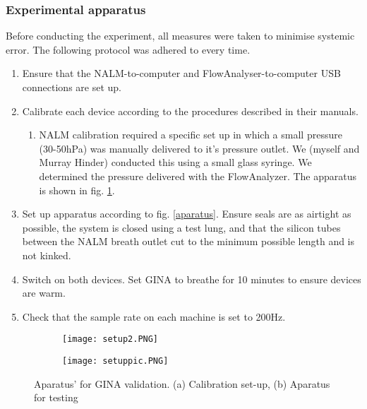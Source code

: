 \documentclass[12pt, openany, oneside]{book}
\begin{document}
\subsubsection{Experimental apparatus}
Before conducting the experiment, all measures were taken to minimise systemic error. The following protocol was adhered to every time.

\begin{enumerate}
\item Ensure that the NALM-to-computer and FlowAnalyser-to-computer USB connections are set up.
\item Calibrate each device according to the procedures described in their manuals.
	\begin{enumerate}
		\item NALM calibration required a specific set up in which a small pressure (30-50hPa) was manually delivered to it's pressure outlet. We (myself and Murray Hinder) conducted this using a small glass syringe. We determined the pressure delivered with the FlowAnalyzer. The apparatus is shown in fig. \ref{fig:cali}.
	\end{enumerate}
\item Set up apparatus according to fig. \ref{aparatus}. Ensure seals are as airtight as possible, the system is closed using a test lung, and that the silicon tubes between the NALM breath outlet cut to the minimum possible length and is not kinked.
\item Switch on both devices. Set GINA to breathe for 10 minutes to ensure devices are warm.
\item Check that the sample rate on each machine is set to 200Hz.
\end{enumerate}

\begin{figure}

		
	\begin{subfigure}{.99\textwidth}	
		\texttt{[image: setup2.PNG]}		
		\caption{}
		\label{fig:cali}
	\end{subfigure}
	
	\begin{subfigure}{.99\textwidth}
		\texttt{[image: setuppic.PNG]}		
		\caption{}
		\label{fig:aparatus}
	\end{subfigure}
	
	\caption[Aparatus' for GINA validation]{Aparatus' for GINA validation. (a) Calibration set-up, (b) Aparatus for testing} 
	
	
\end{figure}
\end{document}
